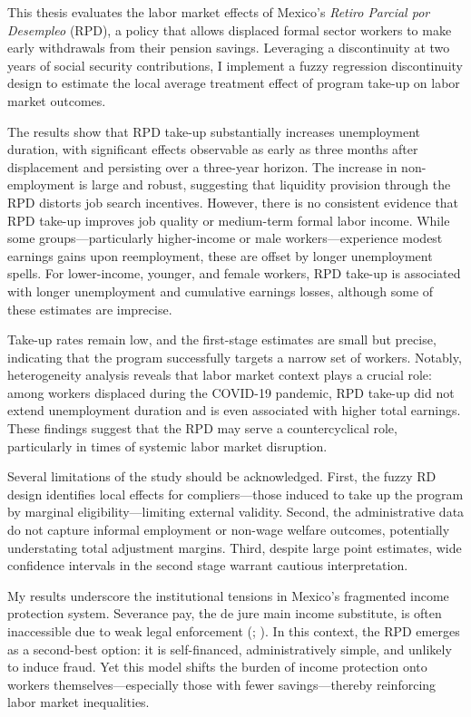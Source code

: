 \documentclass[
  4pt,
]{report}
\begin{document}
This thesis evaluates the labor market effects of Mexico's \emph{Retiro
Parcial por Desempleo} (RPD), a policy that allows displaced formal
sector workers to make early withdrawals from their pension savings.
Leveraging a discontinuity at two years of social security
contributions, I implement a fuzzy regression discontinuity design to
estimate the local average treatment effect of program take-up on labor
market outcomes.

The results show that RPD take-up substantially increases unemployment
duration, with significant effects observable as early as three months
after displacement and persisting over a three-year horizon. The
increase in non-employment is large and robust, suggesting that
liquidity provision through the RPD distorts job search incentives.
However, there is no consistent evidence that RPD take-up improves job
quality or medium-term formal labor income. While some
groups---particularly higher-income or male workers---experience modest
earnings gains upon reemployment, these are offset by longer
unemployment spells. For lower-income, younger, and female workers, RPD
take-up is associated with longer unemployment and cumulative earnings
losses, although some of these estimates are imprecise.

Take-up rates remain low, and the first-stage estimates are small but
precise, indicating that the program successfully targets a narrow set
of workers. Notably, heterogeneity analysis reveals that labor market
context plays a crucial role: among workers displaced during the
COVID-19 pandemic, RPD take-up did not extend unemployment duration and
is even associated with higher total earnings. These findings suggest
that the RPD may serve a countercyclical role, particularly in times of
systemic labor market disruption.

Several limitations of the study should be acknowledged. First, the
fuzzy RD design identifies local effects for compliers---those induced
to take up the program by marginal eligibility---limiting external
validity. Second, the administrative data do not capture informal
employment or non-wage welfare outcomes, potentially understating total
adjustment margins. Third, despite large point estimates, wide
confidence intervals in the second stage warrant cautious
interpretation.

My results underscore the institutional tensions in Mexico's fragmented
income protection system. Severance pay, the de jure main income
substitute, is often inaccessible due to weak legal enforcement
(;
). In this context, the RPD
emerges as a second-best option: it is self-financed, administratively
simple, and unlikely to induce fraud. Yet this model shifts the burden
of income protection onto workers themselves---especially those with
fewer savings---thereby reinforcing labor market inequalities.
\end{document}
